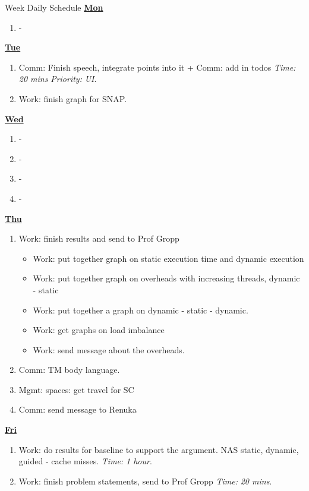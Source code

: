 \documentclass[serif, mathserif, final]{beamer}
\newcommand{\timeEst}[1]{\textit{Time:} \textit{#1}}
\newcommand{\priority}[1]{\textit{Priority:} \textit{#1}}
\begin{document}
\begin{frame}{}
\begin{columns}
\begin{column}{0.50\linewidth}
\begin{block}{Week Daily Schedule} 
\textbf{\small \underline{Mon}}
\begin{enumerate} 
\tiny \item \tiny -
\end{enumerate} 

\textbf{\small \underline{Tue}}
\begin{enumerate}
\tiny \item \tiny Comm: Finish speech, integrate points into it + Comm: add in todos  \timeEst{20 mins} \priority{UI}. 
\item \tiny Work: finish graph for SNAP. 
\end{enumerate} 

\textbf{\small {\underline{Wed}}}
\begin{enumerate} 
\tiny \item\tiny -
\item \tiny -
\item \tiny -
\item \tiny -
\end{enumerate} 

\textbf{\small{\underline{Thu}}}
\begin{enumerate} 
\tiny \item \tiny Work: finish results and send to Prof Gropp 
\begin{itemize} 
\item \tiny Work: put together graph on static execution time and dynamic execution 
\item \tiny Work: put together graph on overheads  with increasing threads,  dynamic - static 
\item \tiny Work: put together a graph on dynamic - static - dynamic.  
\item \tiny Work: get graphs on load imbalance 
\item \tiny Work: send message about the overheads.
\end{itemize} 
\item \tiny Comm: TM body language.
\item \tiny Mgmt: spaces: get travel for SC 
\item \tiny Comm: send message to Renuka

\end{enumerate}

\textbf{\small {\underline{Fri}}} 
\begin{enumerate} 
\tiny \item \tiny Work: do results for baseline to support the argument. NAS static, dynamic, guided - cache misses.  \timeEst{1 hour}. 
\item \tiny Work: finish problem statements, send to Prof Gropp \timeEst{20 mins}. 


\end{enumerate}
\end{block}
\end{column}
\end{columns}
\end{frame}
\end{document}
